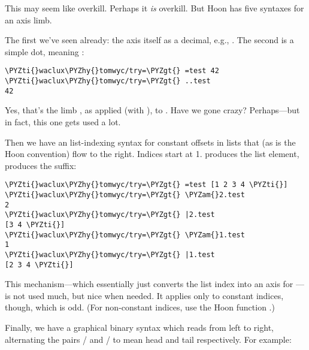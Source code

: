 This may seem like overkill.  Perhaps it \emph{is} overkill.  But Hoon
has five syntaxes for an axis limb.

The first we've seen already: the axis itself as a decimal, e.g.,
.  The second is a simple dot, meaning :

\begin{framed_shaded}
\begin{Verbatim}[fontsize=\relsize{-2.5},fontseries=b,commandchars=\\\{\}]
\PYZti{}waclux\PYZhy{}tomwyc/try=\PYZgt{} =test 42
\PYZti{}waclux\PYZhy{}tomwyc/try=\PYZgt{} ..test
42
\end{Verbatim}
\end{framed_shaded}

Yes, that's the limb , as applied (with ), to .  Have
we gone crazy?  Perhaps---but in fact, this one gets used a lot.

Then we have an list-indexing syntax for constant offsets in
lists that (as is the Hoon convention) flow to the right.
Indices start at 1.  \kode{\&} produces the list element, \kode{\textbar{}} produces
the suffix:

\begin{framed_shaded}
\begin{Verbatim}[fontsize=\relsize{-2.5},fontseries=b,commandchars=\\\{\}]
\PYZti{}waclux\PYZhy{}tomwyc/try=\PYZgt{} =test [1 2 3 4 \PYZti{}]
\PYZti{}waclux\PYZhy{}tomwyc/try=\PYZgt{} \PYZam{}2.test
2
\PYZti{}waclux\PYZhy{}tomwyc/try=\PYZgt{} |2.test
[3 4 \PYZti{}]
\PYZti{}waclux\PYZhy{}tomwyc/try=\PYZgt{} \PYZam{}1.test
1
\PYZti{}waclux\PYZhy{}tomwyc/try=\PYZgt{} |1.test
[2 3 4 \PYZti{}]
\end{Verbatim}
\end{framed_shaded}

This mechanism---which essentially just converts the list index
into an axis for \kode{+}---is not used much, but nice when needed.
It applies only to constant indices, though, which is odd.  (For
non-constant indices, use the Hoon function .)

Finally, we have a graphical binary syntax which reads from left
to right, alternating the pairs \kode{-}/\kode{+} and \kode{\textless{}}/\kode{\textgreater{}} to mean head
and tail respectively.  For example:

